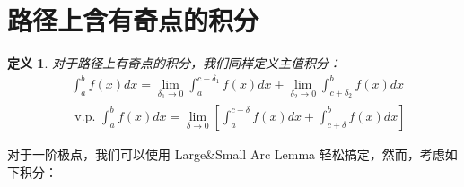 \documentclass[10pt, a4paper, oneside]{ctexbook}
\newtheorem{definition}[theorem]{定义}
\begin{document}
\section{路径上含有奇点的积分}
\begin{definition}
    对于路径上有奇点的积分，我们同样定义主值积分：
    $$
        \begin{aligned}
             & \int_{a}^{b} f(x) d x=\lim _{\delta_{1} \rightarrow 0} \int_{a}^{c-\delta_{1}} f(x) d x+\lim _{\delta_{2} \rightarrow 0} \int_{c+\delta_{2}}^{b} f(x) d x \\
             & \text { v.p. } \int_{a}^{b} f(x) d x=\lim _{\delta \rightarrow 0}\left[\int_{a}^{c-\delta} f(x) d x+\int_{c+\delta}^{b} f(x) d x\right]
        \end{aligned}
    $$
\end{definition}
对于一阶极点，我们可以使用 Large\&Small Arc Lemma 轻松搞定，然而，考虑如下积分：
\end{document}
